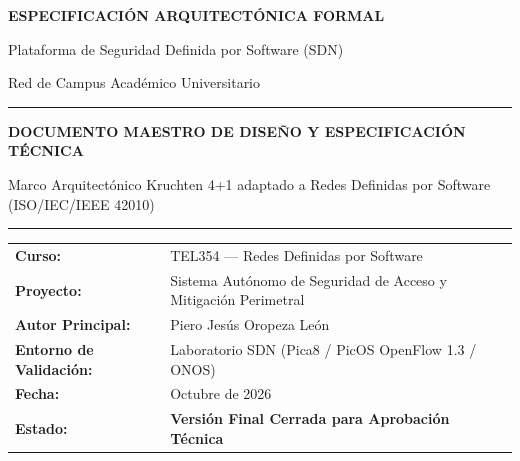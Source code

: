 \documentclass[11pt,a4paper]{report}
\begin{document}
\begin{titlepage}
\centering
\vspace*{1.0cm}
{\huge\bfseries\color{primary} ESPECIFICACIÓN ARQUITECTÓNICA FORMAL\par}
\vspace{0.4cm}
{\LARGE\color{secondary} Plataforma de Seguridad Definida por Software (SDN)\par}
{\Large Red de Campus Académico Universitario\par}
\vspace{1.2cm}
\rule{\linewidth}{1.5pt}\par
\vspace{0.6cm}
{\Large\bfseries DOCUMENTO MAESTRO DE DISEÑO Y ESPECIFICACIÓN TÉCNICA\par}
\vspace{0.2cm}
{\large Marco Arquitectónico Kruchten 4+1 adaptado a Redes Definidas por Software (ISO/IEC/IEEE 42010)\par}
\rule{\linewidth}{1.5pt}\par
\vspace{1.5cm}

\begin{minipage}{0.85\linewidth}
\begin{tabular}{ll}
\textbf{Curso:} & TEL354 --- Redes Definidas por Software \\
\textbf{Proyecto:} & Sistema Autónomo de Seguridad de Acceso y Mitigación Perimetral \\
\textbf{Autor Principal:} & Piero Jesús Oropeza León \\
\textbf{Entorno de Validación:} & Laboratorio SDN (Pica8 / PicOS OpenFlow 1.3 / ONOS) \\
\textbf{Fecha:} & Octubre de 2026 \\
\textbf{Estado:} & \textbf{Versión Final Cerrada para Aprobación Técnica} \\
\end{tabular}
\end{minipage}

\vfill
{}
\vspace*{0.5cm}
\end{titlepage}
\end{document}
